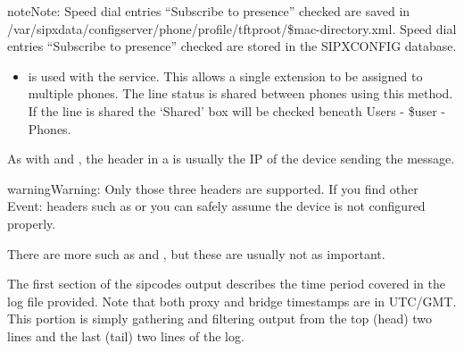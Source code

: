 \documentclass[letterpaper,10pt,english]{sphinxmanual}
\begin{document}
\begin{itemize}
\begin{itemize}

\end{itemize}

\begin{sphinxadmonition}{note}{Note:}
Speed dial entries  “Subscribe to presence” checked are saved in /var/sipxdata/configserver/phone/profile/tftproot/\$mac-directory.xml.
Speed dial entries  “Subscribe to presence” checked are stored in the SIPXCONFIG database.
\end{sphinxadmonition}
\begin{itemize}
\item {} 
 is used with the {\hyperref[\detokenize{webui:shared-appearance-agent}]{}} service.
This allows a single extension to be assigned to multiple phones. The line status is shared between phones using this method.
If the line is shared the ‘Shared’ box will be checked beneath Users - \$user - Phones.


\end{itemize}

As with  and , the  header in a  is usually the IP of the device sending the message.

\begin{sphinxadmonition}{warning}{Warning:}
Only those three  headers are supported. If you find other Event: headers such as  or  you can safely assume the device is not configured properly.
\end{sphinxadmonition}

\end{itemize}

There are more such as  and , but these are usually not as important.

The first section of the sipcodes output describes the time period covered in the log file provided. Note that both proxy and bridge timestamps are in UTC/GMT.
This portion is simply gathering and filtering output from the top (head) two lines and the last (tail) two lines of the log.
\end{document}
